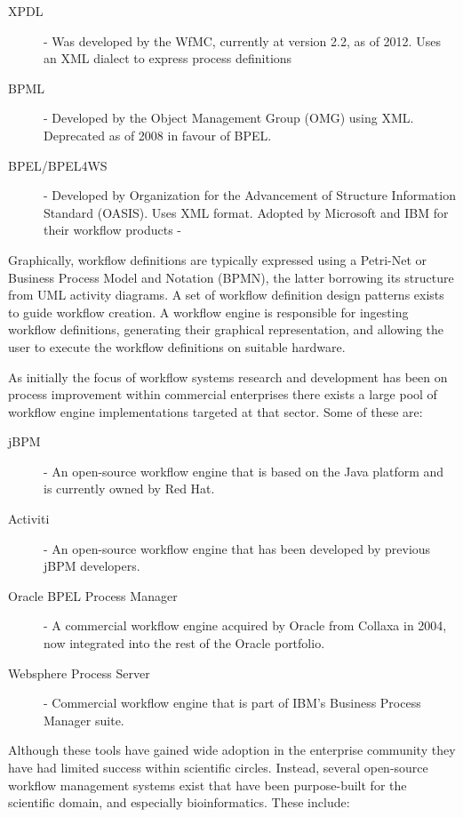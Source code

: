 \begin{description}
\item[XPDL] - Was developed by the WfMC, currently at version 2.2, as of 2012. Uses an XML dialect to express process definitions
\item[BPML] - Developed by the Object Management Group (OMG) using XML. Deprecated as of 2008 in favour of BPEL.
\item[BPEL/BPEL4WS] -  Developed by Organization for the Advancement of Structure Information Standard (OASIS). Uses XML format. Adopted by Microsoft and IBM for their workflow products - 
\end{description} 

Graphically, workflow definitions are typically expressed using a Petri-Net\autocite{peterson1981petri} or Business Process Model and Notation (BPMN), the latter borrowing its structure from UML activity diagrams. A set of workflow definition design patterns exists to guide workflow creation\autocite{van2003workflow}. A workflow engine is responsible for ingesting workflow definitions, generating their graphical representation, and allowing the user to execute the workflow definitions on suitable hardware.

As initially the focus of workflow systems research and development has been on process improvement within commercial enterprises there exists a large pool of workflow engine implementations targeted at that sector. Some of these are:

\begin{description}
\item[jBPM] - An open-source workflow engine that is based on the Java platform and is currently owned by Red Hat.
\item[Activiti] - An open-source workflow engine that has been developed by previous jBPM developers.
\item[Oracle BPEL Process Manager] - A commercial workflow engine acquired by Oracle from Collaxa in 2004, now integrated into the rest of the Oracle portfolio.
\item[Websphere Process Server] - Commercial workflow engine that is part of IBM's Business Process Manager suite.
\end{description}

Although these tools have gained wide adoption in the enterprise community they have had limited success within scientific circles. Instead, several open-source workflow management systems exist that have been purpose-built for the scientific domain, and especially bioinformatics. These include:

